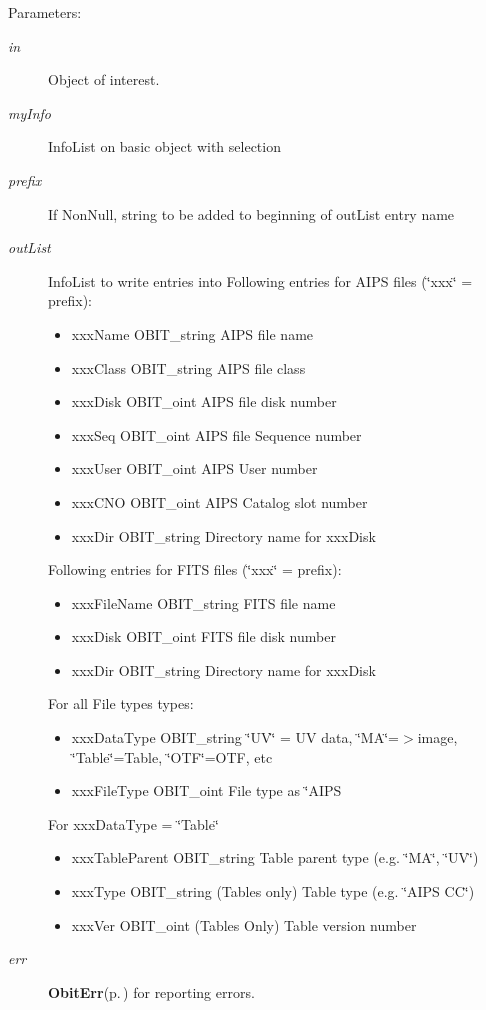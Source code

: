 \begin{Desc}
\item[Parameters:]
\begin{description}
\item[{\em in}]Object of interest. \item[{\em my\-Info}]Info\-List on basic object with selection \item[{\em prefix}]If Non\-Null, string to be added to beginning of out\-List entry name \item[{\em out\-List}]Info\-List to write entries into Following entries for AIPS files (\char`\"{}xxx\char`\"{} = prefix): \begin{itemize}
\item xxx\-Name OBIT\_\-string AIPS file name \item xxx\-Class OBIT\_\-string AIPS file class \item xxx\-Disk OBIT\_\-oint AIPS file disk number \item xxx\-Seq OBIT\_\-oint AIPS file Sequence number \item xxx\-User OBIT\_\-oint AIPS User number \item xxx\-CNO OBIT\_\-oint AIPS Catalog slot number \item xxx\-Dir OBIT\_\-string Directory name for xxx\-Disk\end{itemize}
Following entries for FITS files (\char`\"{}xxx\char`\"{} = prefix): \begin{itemize}
\item xxx\-File\-Name OBIT\_\-string FITS file name \item xxx\-Disk OBIT\_\-oint FITS file disk number \item xxx\-Dir OBIT\_\-string Directory name for xxx\-Disk\end{itemize}
For all File types types: \begin{itemize}
\item xxx\-Data\-Type OBIT\_\-string \char`\"{}UV\char`\"{} = UV data, \char`\"{}MA\char`\"{}=$>$image, \char`\"{}Table\char`\"{}=Table, \char`\"{}OTF\char`\"{}=OTF, etc \item xxx\-File\-Type OBIT\_\-oint File type as \char`\"{}AIPS\end{itemize}
For xxx\-Data\-Type = \char`\"{}Table\char`\"{} \begin{itemize}
\item xxx\-Table\-Parent OBIT\_\-string Table parent type (e.g. \char`\"{}MA\char`\"{}, \char`\"{}UV\char`\"{}) \item xxx\-Type OBIT\_\-string (Tables only) Table type (e.g. \char`\"{}AIPS CC\char`\"{}) \item xxx\-Ver OBIT\_\-oint (Tables Only) Table version number\end{itemize}
\item[{\em err}]{\bf Obit\-Err}{\rm (p.\,\pageref{structObitErr})} for reporting errors. \end{description}
\end{Desc}
